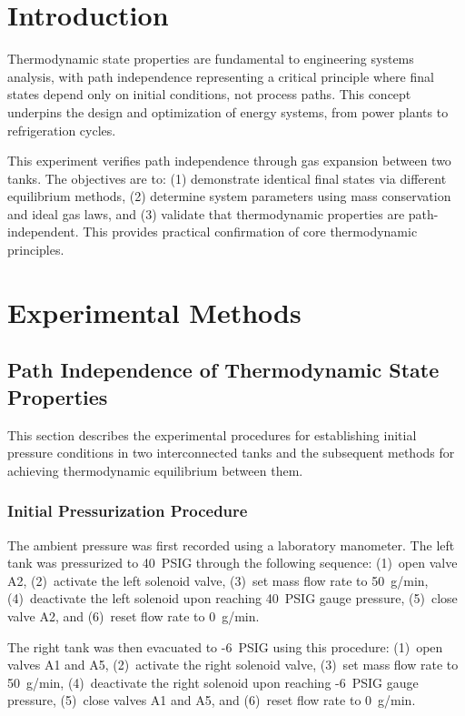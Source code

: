 \documentclass{article} %
\begin{document}
\begin{multicols}{2}


\section{Introduction}
\label{introduction}

Thermodynamic state properties are fundamental to engineering systems analysis, with path independence representing a critical principle where final states depend only on initial conditions, not process paths. This concept underpins the design and optimization of energy systems, from power plants to refrigeration cycles.

This experiment verifies path independence through gas expansion between two tanks. The objectives are to: (1) demonstrate identical final states via different equilibrium methods, (2) determine system parameters using mass conservation and ideal gas laws, and (3) validate that thermodynamic properties are path-independent. This provides practical confirmation of core thermodynamic principles.
\section{Experimental Methods}
\label{experimental_methods}

\subsection{Path Independence of Thermodynamic State Properties}
\label{methods_path_independencies_thermodynamic_properties}

This section describes the experimental procedures for establishing initial pressure conditions in two interconnected tanks and the subsequent methods for achieving thermodynamic equilibrium between them.

\subsubsection{Initial Pressurization Procedure}

The ambient pressure was first recorded using a laboratory manometer. The left tank was pressurized to 40~PSIG through the following sequence: (1)~open valve A2, (2)~activate the left solenoid valve, (3)~set mass flow rate to 50~g/min, (4)~deactivate the left solenoid upon reaching 40~PSIG gauge pressure, (5)~close valve A2, and (6)~reset flow rate to 0~g/min.

The right tank was then evacuated to -6~PSIG using this procedure: (1)~open valves A1 and A5, (2)~activate the right solenoid valve, (3)~set mass flow rate to 50~g/min, (4)~deactivate the right solenoid upon reaching -6~PSIG gauge pressure, (5)~close valves A1 and A5, and (6)~reset flow rate to 0~g/min.


\end{multicols}
\end{document}
